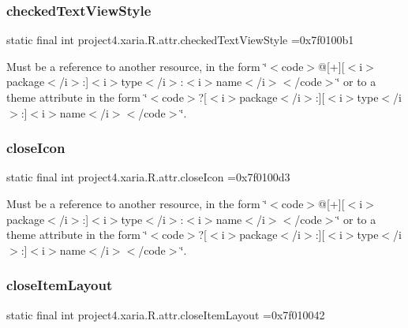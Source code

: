 \subsubsection{\texorpdfstring{checked\+Text\+View\+Style}{checkedTextViewStyle}}
{\footnotesize\ttfamily static final int project4.\+xaria.\+R.\+attr.\+checked\+Text\+View\+Style =0x7f0100b1\hspace{0.3cm}{\ttfamily [static]}}

Must be a reference to another resource, in the form \char`\"{}$<$code$>$@\mbox{[}+\mbox{]}\mbox{[}$<$i$>$package$<$/i$>$\+:\mbox{]}$<$i$>$type$<$/i$>$\+:$<$i$>$name$<$/i$>$$<$/code$>$\char`\"{} or to a theme attribute in the form \char`\"{}$<$code$>$?\mbox{[}$<$i$>$package$<$/i$>$\+:\mbox{]}\mbox{[}$<$i$>$type$<$/i$>$\+:\mbox{]}$<$i$>$name$<$/i$>$$<$/code$>$\char`\"{}. \mbox{\label{classproject4_1_1xaria_1_1R_1_1attr_a74eef03066e2146a7eb7e53495af53c7}} 
\subsubsection{\texorpdfstring{close\+Icon}{closeIcon}}
{\footnotesize\ttfamily static final int project4.\+xaria.\+R.\+attr.\+close\+Icon =0x7f0100d3\hspace{0.3cm}{\ttfamily [static]}}

Must be a reference to another resource, in the form \char`\"{}$<$code$>$@\mbox{[}+\mbox{]}\mbox{[}$<$i$>$package$<$/i$>$\+:\mbox{]}$<$i$>$type$<$/i$>$\+:$<$i$>$name$<$/i$>$$<$/code$>$\char`\"{} or to a theme attribute in the form \char`\"{}$<$code$>$?\mbox{[}$<$i$>$package$<$/i$>$\+:\mbox{]}\mbox{[}$<$i$>$type$<$/i$>$\+:\mbox{]}$<$i$>$name$<$/i$>$$<$/code$>$\char`\"{}. \mbox{\label{classproject4_1_1xaria_1_1R_1_1attr_ae6fd421b77209ccc406a4513fe3c4833}} 
\subsubsection{\texorpdfstring{close\+Item\+Layout}{closeItemLayout}}
{\footnotesize\ttfamily static final int project4.\+xaria.\+R.\+attr.\+close\+Item\+Layout =0x7f010042\hspace{0.3cm}{\ttfamily [static]}}

